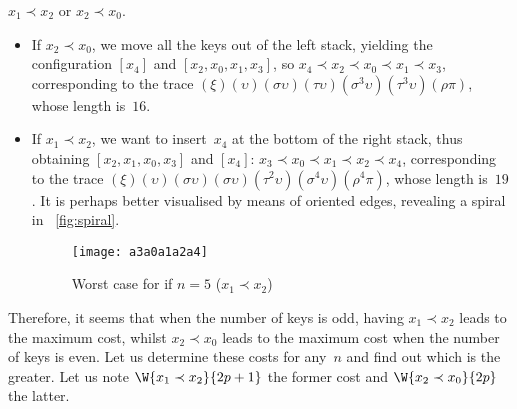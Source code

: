 \(x_1 \prec x_2\) or \(x_2 \prec x_0\).
\begin{itemize}

\item If \(x_2 \prec x_0\), we move all the keys out of the left
  stack, yielding the configuration \([x_4]\) and \([x_2, x_0, x_1,
  x_3]\), so \(x_4 \prec x_2 \prec x_0 \prec x_1 \prec x_3\),
  corresponding to the trace
  \((\xi)(\upsilon)(\sigma\upsilon)(\tau\upsilon)(\sigma^3\upsilon)
  (\tau^3\upsilon)(\rho\pi)\), whose length is~\(16\).

\item If \(x_1 \prec x_2\), we want to insert~\(x_4\) at the bottom of
  the right stack, thus obtaining \([x_2, x_1, x_0, x_3]\) and
  \([x_4]\): \(x_3 \prec x_0 \prec x_1 \prec x_2 \prec x_4\),
  corresponding to the trace \((\xi)(\upsilon)
  (\sigma\upsilon)(\sigma\upsilon)(\tau^2\upsilon)(\sigma^4\upsilon)
  (\rho^4\pi)\), whose length is~\(19\). It is perhaps better
  visualised by means of oriented edges, revealing a spiral in
  \fig~\vref{fig:spiral}.
    \begin{figure}
      \centering
      \texttt{[image: a3a0a1a2a4]}
      \caption{Worst case for  if \(n=5\) (\(x_1 \prec x_2\))}
      \label{fig:spiral}
    \end{figure}

\end{itemize}
Therefore, it seems that when the number of keys is odd, having \(x_1
\prec x_2\) leads to the maximum cost, whilst \(x_2 \prec x_0\) leads
to the maximum cost when the number of keys is even. Let us determine
these costs for any~\(n\) and find out which is the greater. Let us
note \(\W{x_1 \prec x_2}{2p+1}\) the former cost and \(\W{x_2 \prec
  x_0}{2p}\) the latter.
